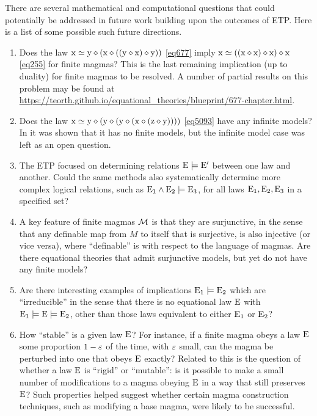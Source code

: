 There are several mathematical and computational questions that could potentially be addressed in future work building upon the outcomes of ETP.  Here is a list of some possible such future directions.
\begin{enumerate}
  \item Does the law $\mathrm{x} \simeq \mathrm{y} \diamond (\mathrm{x} \diamond ((\mathrm{y} \diamond \mathrm{x}) \diamond \mathrm{y}))$ \eqref{eq677} imply $\mathrm{x} \simeq ((\mathrm{x} \diamond \mathrm{x}) \diamond \mathrm{x}) \diamond \mathrm{x}$ \eqref{eq255} for finite magmas? This is the last remaining implication (up to duality) for finite magmas to be resolved.  A number of partial results on this problem may be found at \url{https://teorth.github.io/equational_theories/blueprint/677-chapter.html}.
  \item Does the law $\mathrm{x} \simeq \mathrm{y} \diamond (\mathrm{y} \diamond (\mathrm{y} \diamond (\mathrm{x} \diamond (\mathrm{z} \diamond \mathrm{y}))))$ \eqref{eq5093} have any infinite models? In \cite{Kisielewicz2} it was shown that it has no finite models, but the infinite model case was left as an open question.
  \item The ETP focused on determining relations $\mathrm{E} \models \mathrm{E}'$ between one law and another.  Could the same methods also systematically determine more complex logical relations, such as $\mathrm{E}_1 \wedge \mathrm{E}_2 \models \mathrm{E}_3$, for all laws $\mathrm{E}_1,\mathrm{E}_2,\mathrm{E}_3$ in a specified set?
  \item A key feature of finite magmas ${\mathcal{M}}$ is that they are surjunctive, in the sense that any definable map from $M$ to itself that is surjective, is also injective (or vice versa), where ``definable'' is with respect to the language of magmas.  Are there equational theories that admit surjunctive models, but yet do not have any finite models?
  \item Are there interesting examples of implications $\mathrm{E}_1 \models \mathrm{E}_2$ which are ``irreducible'' in the sense that there is no equational law $\mathrm{E}$ with $\mathrm{E}_1 \models \mathrm{E} \models \mathrm{E}_2$, other than those laws equivalent to either $\mathrm{E}_1$ or $\mathrm{E}_2$?
  \item How ``stable'' is a given law $\mathrm{E}$?  For instance, if a finite magma obeys a law $\mathrm{E}$ some proportion $1-\varepsilon$ of the time, with $\varepsilon$ small, can the magma be perturbed into one that obeys $\mathrm{E}$ exactly?  Related to this is the question of whether a law $\mathrm{E}$ is ``rigid'' or ``mutable'': is it possible to make a small number of modifications to a magma obeying $\mathrm{E}$ in a way that still preserves $\mathrm{E}$?  Such properties helped suggest whether certain magma construction techniques, such as modifying a base magma, were likely to be successful.
\end{enumerate}

